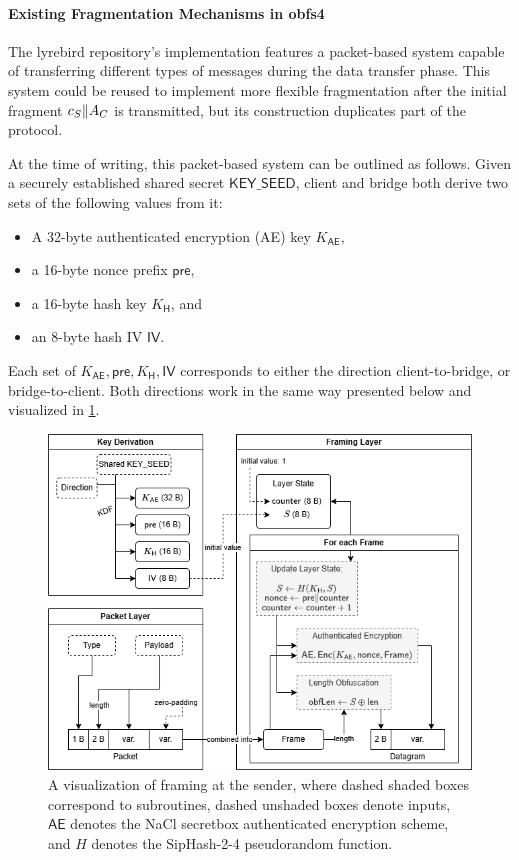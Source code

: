 \paragraph{Existing Fragmentation Mechanisms in obfs4}
The lyrebird repository's \obfsfour{} implementation features a packet-based system capable of transferring different types of messages during the data transfer phase. This system could be reused to implement more flexible fragmentation after the initial fragment $c_S \| A_C$ is transmitted, but its construction duplicates part of the \drivel{} protocol.

At the time of writing, this packet-based system can be outlined as follows. Given a securely established shared secret $\mathsf{KEY\_SEED}$, client and bridge both derive two sets of the following values from it:
\begin{itemize}
    \item A 32-byte authenticated encryption (AE) key $K_\mathsf{AE}$,
    \item a 16-byte nonce prefix $\mathsf{pre}$,
    \item a 16-byte hash key $K_\mathsf{H}$, and
    \item an 8-byte hash IV $\mathsf{IV}$.
\end{itemize}

Each set of $K_\mathsf{AE}, \mathsf{pre}, K_\mathsf{H}, \mathsf{IV}$ corresponds to either the direction client-to-bridge, or bridge-to-client. Both directions work in the same way presented below and visualized in \cref{fig:framing}.

\begin{figure}
    \centering
    \includegraphics[width=\linewidth]{images/packet-framing.png}
    \caption[
        A visualization of \obfsfour{} framing at the sender.
    ]{
        A visualization of \obfsfour{} framing at the sender, where dashed shaded boxes correspond to subroutines, dashed unshaded boxes denote inputs, $\mathsf{AE}$ denotes the NaCl secretbox authenticated encryption scheme, and $H$ denotes the SipHash-2-4 pseudorandom function. 
    }
    \label{fig:framing}
\end{figure}


